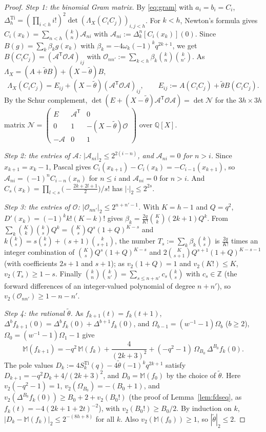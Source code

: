 \documentclass[11pt]{amsart}
\theoremstyle{definition}
\theoremstyle{remark}
\numberwithin{equation}{section}
\newcommand{\ZZ}{\mathbb{Z}}
\newcommand{\QQ}{\mathbb{Q}}
\newcommand{\Ti}{\operatorname{Ti}}
\begin{document}
\begin{proof}
\emph{Step 1: the binomial Gram matrix.} By \eqref{eq:gram} with $a_i=b_i=C_i$,
$\Delta^{\Ti}_h=(\prod_{i<h}i!)^2\det(\Lambda_X(C_iC_j))_{i,j<h}$. For $k<h$, Newton's formula gives
$C_i(x_k)=\sum_{n<h}\binom kn\mathcal A_{ni}$ with $\mathcal A_{ni}:=\Delta^n_k[C_i(x_k)](0)$. Since $B(g)=\sum_k\beta_kg(x_k)$
with $\beta_k=-4\omega_k(-1)^kq^{2k+1}$, we get $B(C_iC_j)=(\mathcal A^{\mathsf T}\mathcal O\mathcal A)_{ij}$ with
$\mathcal O_{nn'}:=\sum_{k<h}\beta_k\binom kn\binom k{n'}$. As $\Lambda_X=(A+\tilde\theta B)+(X-\tilde\theta)B$,
\[
  \Lambda_X(C_iC_j)=E_{ij}+(X-\tilde\theta)(\mathcal A^{\mathsf T}\mathcal O\mathcal A)_{ij},\qquad
  E_{ij}:=A(C_iC_j)+\tilde\theta B(C_iC_j).
\]
By the Schur complement, $\det(E+(X-\tilde\theta)\mathcal A^{\mathsf T}\mathcal O\mathcal A)=\det\mathcal N$ for the
$3h\times3h$ matrix
$\mathcal N=\begin{pmatrix}E&\mathcal A^{\mathsf T}&0\\0&1&-(X-\tilde\theta)\mathcal O\\-\mathcal A&0&1\end{pmatrix}$ over
$\QQ[X]$.

\emph{Step 2: the entries of $\mathcal A$: $|\mathcal A_{ni}|_2\le2^{2(i-n)}$, and $\mathcal A_{ni}=0$ for $n>i$.} Since
$x_{k+1}=x_k-1$, Pascal gives $C_i(x_{k+1})-C_i(x_k)=-C_{i-1}(x_{k+1})$, so $\mathcal A_{ni}=(-1)^nC_{i-n}(x_n)$ for $n\le i$
and $\mathcal A_{ni}=0$ for $n>i$. And $C_s(x_k)=\prod_{l<s}\bigl(-\frac{2k+2l+1}2\bigr)/s!$ has $|\cdot|_2\le2^{2s}$.

\emph{Step 3: the entries of $\mathcal O$: $|\mathcal O_{nn'}|_2\le2^{n+n'-1}$.} With $K=h-1$ and $Q=q^2$,
$D'(x_k)=(-1)^kk!(K-k)!$ gives $\beta_k=\frac{2q}{K!}\binom Kk(2k+1)Q^k$. From
$\sum_k\binom Kk\binom ksQ^k=\binom KsQ^s(1+Q)^{K-s}$ and $k\binom ks=s\binom ks+(s+1)\binom k{s+1}$, the number
$T_s:=\sum_k\beta_k\binom ks$ is $\frac{2q}{K!}$ times an integer combination of $\binom KsQ^s(1+Q)^{K-s}$ and
$2\binom K{s+1}Q^{s+1}(1+Q)^{K-s-1}$ (with coefficients $2s+1$ and $s+1$); as $v_2(1+Q)=1$ and $v_2(K!)\le K$,
$v_2(T_s)\ge1-s$. Finally $\binom kn\binom k{n'}=\sum_{s\le n+n'}c_s\binom ks$ with $c_s\in\ZZ$ (the forward differences of an
integer-valued polynomial of degree $n+n'$), so $v_2(\mathcal O_{nn'})\ge1-n-n'$.

\emph{Step 4: the rational $\tilde\theta$.} As $f_{k+1}(t)=f_k(t+1)$, $\Delta^bf_{k+1}(0)=\Delta^bf_k(0)+\Delta^{b+1}f_k(0)$,
and $\Omega_{b-1}=(w^{-1}-1)\Omega_b$ ($b\ge2$), $\Omega_0=(w^{-1}-1)\Omega_1-1$ give
\[
  \mathbb M(f_{k+1})=-q^2\,\mathbb M(f_k)+\frac4{(2k+3)^2}+(-q^2-1)\,\Omega_{B_0}\,\Delta^{B_0}f_k(0).
\]
The pole values $D_k:=4S^{\Ti}_k(q)-4\tilde\theta(-1)^kq^{2k+1}$ satisfy $D_{k+1}=-q^2D_k+4/(2k+3)^2$, and
$D_0=\mathbb M(f_0)$ by the choice of $\tilde\theta$. Here $v_2(-q^2-1)=1$, $v_2(\Omega_{B_0})=-(B_0+1)$, and
$v_2(\Delta^{B_0}f_k(0))\ge B_0+2+v_2(B_0!)$ (the proof of Lemma~\ref{lem:fdseq}, as $f_k(t)=-4(2k+1+2t)^{-2}$), with
$v_2(B_0!)\ge B_0/2$. By induction on $k$, $|D_k-\mathbb M(f_k)|_2\le2^{-(8h+8)}$ for all $k$. Also
$v_2(\mathbb M(f_0))\ge1$, so $|\tilde\theta|_2\le2$.


\end{proof}
\end{document}
